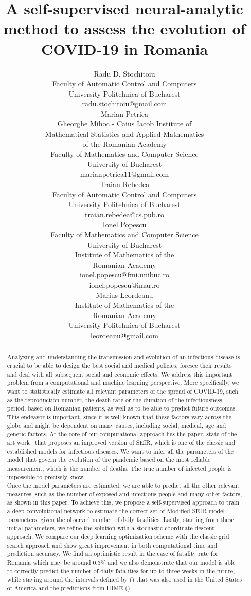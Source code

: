 \documentclass[11pt]{article}
\title{A self-supervised neural-analytic method to assess the evolution of COVID-19 in Romania}
\author{
  Radu D. Stochitoiu \\
  {\small Faculty of Automatic Control and Computers}\\
  {\small University Politehnica of Bucharest} \\
  {\small radu.stochitoiu@gmail.com} \\
   \And
   Marian Petrica \\
   {\small Gheorghe Mihoc - Caius Iacob Institute of}\\
   {\small Mathematical Statistics and Applied Mathematics}\\
   {\small of the Romanian Academy}\\
   {\small Faculty of Mathematics and Computer Science}\\
   {\small University of Bucharest}\\
   {\small marianpetrica11@gmail.com} \\
   \And
   Traian Rebedea \\
   {\small Faculty of Automatic Control and Computers}\\
   {\small University Politehnica of Bucharest}\\
   {\small traian.rebedea@cs.pub.ro} \\
   \And
   Ionel Popescu \\
   {\small Faculty of Mathematics and Computer Science}\\ {\small University of Bucharest} \\
   {\small Institute of Mathematics of the} \\
   {\small Romanian Academy} \\
   {\small ionel.popescu@fmi.unibuc.ro\\ ionel.popescu@imar.ro} \\
   \And
   Marius Leordeanu \\
   {\small Institute of Mathematics of the} \\
   {\small Romanian Academy} \\
   {\small University Politehnica of Bucharest} \\
   {\small leordeanu@gmail.com} \\
}
\begin{document}
\maketitle

\begin{abstract}
  Analyzing and understanding the transmission and evolution of an infectious disease is crucial to be able to design the best social and medical policies, foresee their results and deal with all subsequent social and economic effects. We address this important problem from a computational and machine learning perspective. More specifically, we want to statistically estimate all relevant parameters of the spread of COVID-19, such as the reproduction number, the death rate or the duration of the infectiousness period, based on Romanian patients, as well as to be able to predict future outcomes. This endeavor is important, since it is well known that these factors vary across the globe and might be dependent on many causes, including social, medical, age and genetic factors. At the core of our computational approach lies the paper, state-of-the-art work~\cite{chowdhury2020dynamic} that proposes an improved version of SEIR, which is one of the classic and established models for infectious diseases. We want to infer all the parameters of the model that govern the evolution of the pandemic based on the most reliable measurement, which is the number of deaths. The true number of infected people is impossible to precisely know.\\
  Once the model parameters are estimated, we are able to predict all the other relevant measures, such as the number of exposed and infectious people and many other factors, as shown in this paper. To achieve this, we propose a self-supervised approach to train a deep convolutional network to estimate the correct set of Modified-SEIR model parameters, given the observed number of daily fatalities. Lastly, starting from these initial parameters, we refine the solution with a stochastic coordinate descent approach. We compare our deep learning optimization scheme with the classic grid search approach and show great improvement in both computational time and prediction accuracy. We find an optimistic result in the case of fatality rate for Romania which may be around 0.3\% and we also demonstrate that our model is able to correctly predict the number of daily fatalities for up to three weeks in the future, while staying around the intervals defined by (\cite{Youyanggu}) that was also used in the United States of America and the predictions from IHME (\cite{2020.04.21.20074732}).
\end{abstract}
\end{document}
